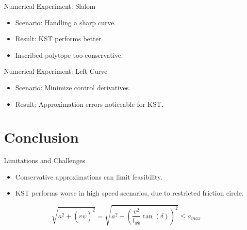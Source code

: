 \documentclass[shortpres,aspectratio=43]{beamer}
\newcommand\blfootnote[1]{%
  \begingroup
  \renewcommand\thefootnote{}\footnote{#1}%
  \addtocounter{footnote}{-1}%
  \endgroup
}
\begin{document}
\begin{frame}{Numerical Experiment: Slalom}
  \begin{itemize}
    \item Scenario: Handling a sharp curve.
    \item Result: KST performs better.
    \item Inscribed polytope too conservative.
  \end{itemize}
\end{frame}

\begin{frame}{Numerical Experiment: Left Curve}
  \begin{itemize}
    \item Scenario: Minimize control derivatives.
    \item Result: Approximation errors noticeable for KST.
  \end{itemize}
\end{frame}

\section{Conclusion}

\begin{frame}{Limitations and Challenges}
  \begin{itemize}
    \item Conservative approximations can limit feasibility.
    \item KST performs worse in high speed scenarios, due to restricted friction circle.
  \end{itemize}
  \begin{equation}
    \sqrt{a^2 + \left(v\dot{\psi}\right)^2} = \sqrt{a^2 + \left(\frac{v^2}{l_{wb}} \tan(\delta)\right)^2} \leq a_{max}
  \end{equation}
\end{frame}

\end{document}
